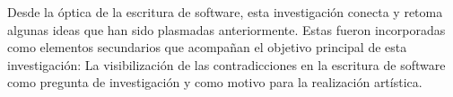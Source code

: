 Desde la óptica de la escritura de software, esta investigación conecta y retoma algunas ideas que han sido plasmadas anteriormente. Estas fueron incorporadas como elementos secundarios que acompañan el objetivo principal de esta investigación: La visibilización de las contradicciones en la escritura de software como pregunta de investigación y como motivo para la realización artística.









